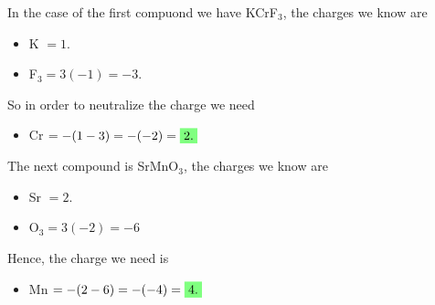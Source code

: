 \begin{questions}
\begin{solution}
In the case of the first compuond we have KCrF$_3$, the charges we know are
\begin{itemize}
  \item K $ = 1$.
  \item F$_3 = 3(-1) =-3$.
\end{itemize}
So in order to neutralize the charge we need
\begin{itemize}
  \item Cr $= - (1-3) = - (-2) = \hlgreen{2.}$
\end{itemize}

The next compound is SrMnO$_3$, the charges we know are
\begin{itemize}
  \item Sr $=2$.
  \item O$_3 = 3(-2) = -6$
\end{itemize}
Hence, the charge we need is
\begin{itemize}
  \item Mn $= - (2-6) = -(-4) = \hlgreen{4.}$
\end{itemize}
\end{solution}



\end{questions}
